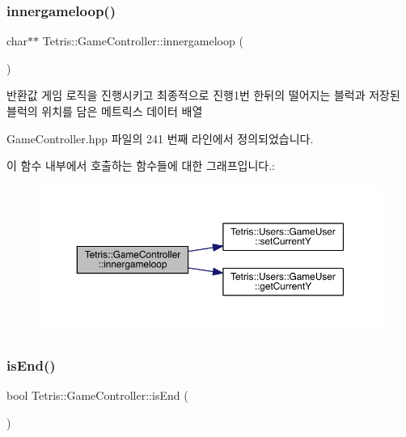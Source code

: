 \subsubsection{\texorpdfstring{innergameloop()}{innergameloop()}\hspace{0.1cm}{\footnotesize\ttfamily [2/2]}}
{\footnotesize\ttfamily char$\ast$$\ast$ Tetris\+::\+Game\+Controller\+::innergameloop (\begin{DoxyParamCaption}{ }\end{DoxyParamCaption})\hspace{0.3cm}{\ttfamily [inline]}}

\begin{DoxyReturn}{반환값}
게임 로직을 진행시키고 최종적으로 진행1번 한뒤의 떨어지는 블럭과 저장된 블럭의 위치를 담은 메트릭스 데이터 배열 
\end{DoxyReturn}


Game\+Controller.\+hpp 파일의 241 번째 라인에서 정의되었습니다.

이 함수 내부에서 호출하는 함수들에 대한 그래프입니다.\+:
\nopagebreak
\begin{figure}[H]
\begin{center}
\leavevmode
\includegraphics[width=350pt]{class_tetris_1_1_game_controller_a028a1a0270750bcae1e2e2cbbbe7609a_cgraph}
\end{center}
\end{figure}
\mbox{\label{class_tetris_1_1_game_controller_a0fa9ec1dd636ecc916cd4460e14781c4}} 
\subsubsection{\texorpdfstring{is\+End()}{isEnd()}\hspace{0.1cm}{\footnotesize\ttfamily [1/2]}}
{\footnotesize\ttfamily bool Tetris\+::\+Game\+Controller\+::is\+End (\begin{DoxyParamCaption}{ }\end{DoxyParamCaption})\hspace{0.3cm}{\ttfamily [inline]}}



